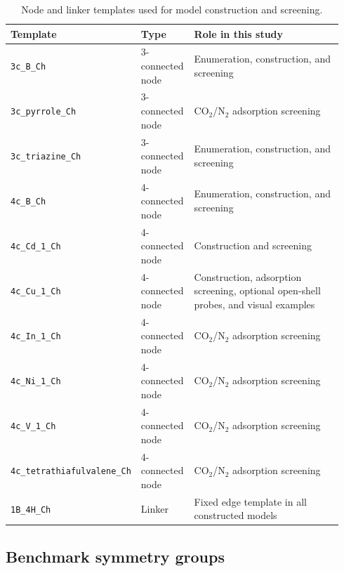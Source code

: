 \documentclass[a5paper, 10pt]{article}
\begin{document}
\begin{table}[H]
\centering
\scriptsize
\setlength{\tabcolsep}{1.2mm}
\renewcommand{\arraystretch}{1.15}
\caption{Node and linker templates used for model construction and screening.}
\label{tab:building_units}
\begin{tabular}{@{}p{0.32\linewidth}p{0.16\linewidth}p{0.46\linewidth}@{}}
\toprule
\textbf{Template} & \textbf{Type} & \textbf{Role in this study} \\
\midrule
\texttt{3c\_B\_Ch} & 3-connected node & Enumeration, construction, and screening \\
\texttt{3c\_pyrrole\_Ch} & 3-connected node & CO$_2$/N$_2$ adsorption screening \\
\texttt{3c\_triazine\_Ch} & 3-connected node & Enumeration, construction, and screening \\
\texttt{4c\_B\_Ch} & 4-connected node & Enumeration, construction, and screening \\
\texttt{4c\_Cd\_1\_Ch} & 4-connected node & Construction and screening \\
\texttt{4c\_Cu\_1\_Ch} & 4-connected node & Construction, adsorption screening, optional open-shell probes, and visual examples \\
\texttt{4c\_In\_1\_Ch} & 4-connected node & CO$_2$/N$_2$ adsorption screening \\
\texttt{4c\_Ni\_1\_Ch} & 4-connected node & CO$_2$/N$_2$ adsorption screening \\
\texttt{4c\_V\_1\_Ch} & 4-connected node & CO$_2$/N$_2$ adsorption screening \\
\texttt{4c\_tetrathiafulvalene\_Ch} & 4-connected node & CO$_2$/N$_2$ adsorption screening \\
\texttt{1B\_4H\_Ch} & Linker & Fixed edge template in all constructed models \\
\bottomrule
\end{tabular}
\end{table}

\subsection{Benchmark symmetry groups}
\label{app:benchmark_symmetry}
\end{document}
